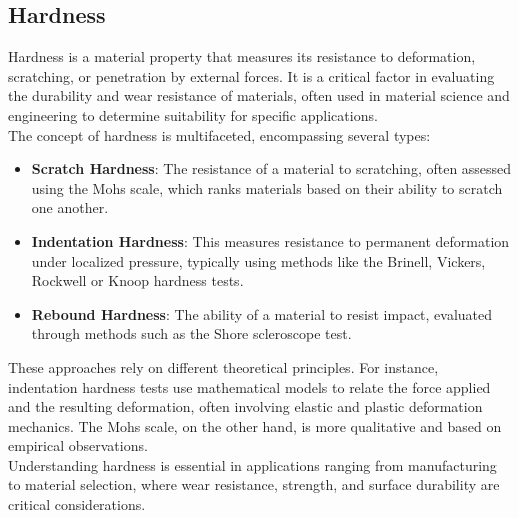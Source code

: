 \documentclass{article}
\begin{document}
   \subsection{Hardness}\label{hardnesstypes}
    Hardness is a material property that measures its resistance to deformation, scratching, or penetration by external forces. It is a critical factor in evaluating the durability and wear resistance of materials, often used in material science and engineering to determine suitability for specific applications.\\[8pt]
    The concept of hardness is multifaceted, encompassing several types:
    \begin{itemize}
        \item \textbf{Scratch Hardness}: The resistance of a material to scratching, often assessed using the Mohs scale, which ranks materials based on their ability to scratch one another.
        \item \textbf{Indentation Hardness}: This measures resistance to permanent deformation under localized pressure, typically using methods like the Brinell, Vickers, Rockwell or Knoop hardness tests.
        \item \textbf{Rebound Hardness}: The ability of a material to resist impact, evaluated through methods such as the Shore scleroscope test.
    \end{itemize}
    These approaches rely on different theoretical principles. For instance, indentation hardness tests use mathematical models to relate the force applied and the resulting deformation, often involving elastic and plastic deformation mechanics. The Mohs scale, on the other hand, is more qualitative and based on empirical observations.\\[8pt]
    Understanding hardness is essential in applications ranging from manufacturing to material selection, where wear resistance, strength, and surface durability are critical considerations.
\end{document}
